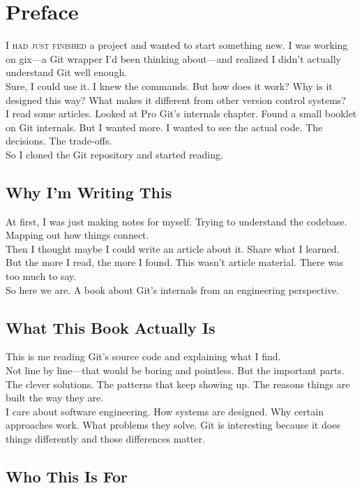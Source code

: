 
\chapter*{Preface}

\lettrine{I}{  had just finished} a project and wanted to start something new. I was working on gix—a Git wrapper I'd been thinking about—and realized I didn't actually understand Git well enough.\\
Sure, I could use it. I knew the commands. But how does it work? Why is it designed this way? What makes it different from other version control systems?\\
I read some articles. Looked at Pro Git's internals chapter. Found a small booklet on Git internals. But I wanted more. I wanted to see the actual code. The decisions. The trade-offs.\\
So I cloned the Git repository and started reading.

\section*{Why I'm Writing This}

At first, I was just making notes for myself. Trying to understand the codebase. Mapping out how things connect.\\
Then I thought maybe I could write an article about it. Share what I learned.\\
But the more I read, the more I found. This wasn't article material. There was too much to say.\\
So here we are. A book about Git's internals from an engineering perspective.\\

\section*{What This Book Actually Is}
This is me reading Git's source code and explaining what I find.\\
Not line by line—that would be boring and pointless. But the important parts. The clever solutions. The patterns that keep showing up. The reasons things are built the way they are.\\
I care about software engineering. How systems are designed. Why certain approaches work. What problems they solve. Git is interesting because it does things differently and those differences matter.

\section*{Who This Is For}

